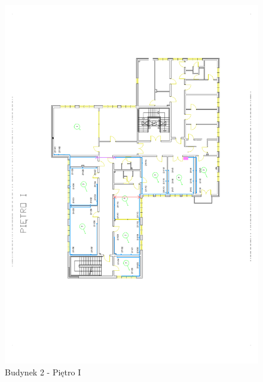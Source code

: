 \begin{figure}[H]
  \begin{center}
    \includegraphics[width=\textwidth]{img/s/b2-1.pdf}
    \caption{Budynek 2 - Piętro I}
  \end{center}
\end{figure}

